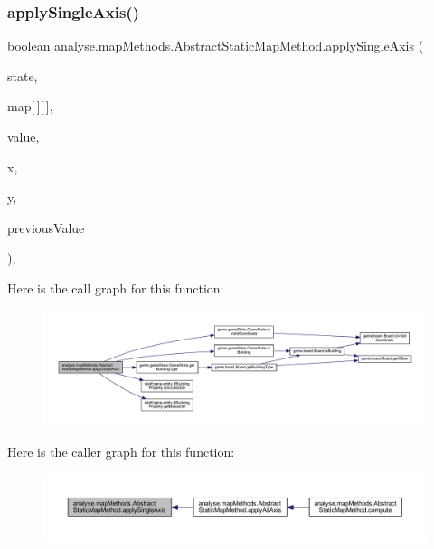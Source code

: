 \subsubsection{\texorpdfstring{apply\+Single\+Axis()}{applySingleAxis()}}
{\footnotesize\ttfamily boolean analyse.\+map\+Methods.\+Abstract\+Static\+Map\+Method.\+apply\+Single\+Axis (\begin{DoxyParamCaption}\item[{\mbox{\hyperlink{classgame_1_1game_state_1_1_game_state}{Game\+State}}}]{state,  }\item[{double}]{map\mbox{[}$\,$\mbox{]}\mbox{[}$\,$\mbox{]},  }\item[{int}]{value,  }\item[{int}]{x,  }\item[{int}]{y,  }\item[{boolean}]{previous\+Value }\end{DoxyParamCaption})\hspace{0.3cm}{\ttfamily [inline]}, {\ttfamily [private]}}

Here is the call graph for this function\+:
\nopagebreak
\begin{figure}[H]
\begin{center}
\leavevmode
\includegraphics[width=350pt]{classanalyse_1_1map_methods_1_1_abstract_static_map_method_af36453d4f13bf86967d153d5e5575ad5_cgraph}
\end{center}
\end{figure}
Here is the caller graph for this function\+:
\nopagebreak
\begin{figure}[H]
\begin{center}
\leavevmode
\includegraphics[width=350pt]{classanalyse_1_1map_methods_1_1_abstract_static_map_method_af36453d4f13bf86967d153d5e5575ad5_icgraph}
\end{center}
\end{figure}
\mbox{\label{classanalyse_1_1map_methods_1_1_abstract_static_map_method_a314b86189e095a68a77027e051f0ea9c}} 
